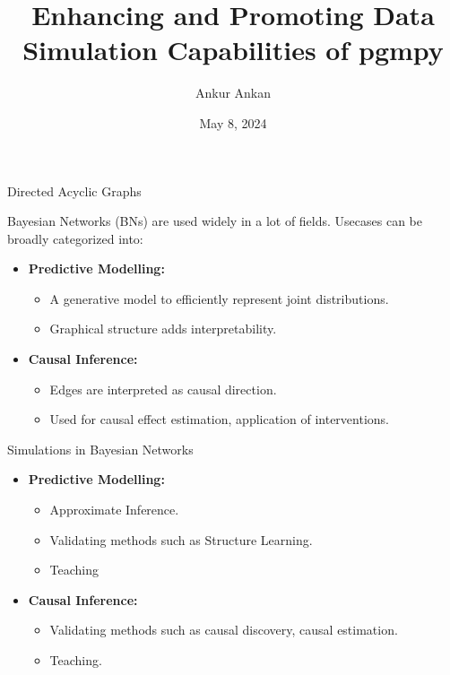 \documentclass{beamer}
\title[]{Enhancing and Promoting Data Simulation Capabilities of pgmpy}
\author{Ankur Ankan}
\date{May 8, 2024}
\begin{document}
\maketitle

\begin{frame}{Directed Acyclic Graphs}


Bayesian Networks (BNs) are used widely in a lot of fields. Usecases can be broadly categorized into: 
\begin{itemize}
	\item \textbf{Predictive Modelling:}
		\begin{itemize}
			\item A generative model to efficiently represent joint distributions.
			\item Graphical structure adds interpretability.
		\end{itemize}
	\item \textbf{Causal Inference:}
		\begin{itemize}
			\item Edges are interpreted as causal direction.
			\item Used for causal effect estimation, application of interventions.
		\end{itemize}
\end{itemize}

\end{frame}

\begin{frame}{Simulations in Bayesian Networks}
	\begin{itemize}
		\item \textbf{Predictive Modelling:}
			\begin{itemize}
				\item Approximate Inference.
				\item Validating methods such as Structure Learning.
				\item Teaching
			\end{itemize}
		\item \textbf{Causal Inference:}
			\begin{itemize}
				\item Validating methods such as causal discovery, causal estimation.
				\item Teaching.
			\end{itemize}
	\end{itemize}

\end{frame}
\end{document}
